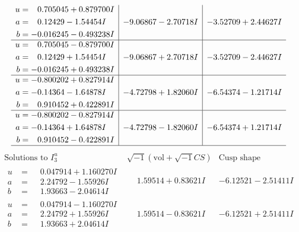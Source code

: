 \documentclass[1p]{elsarticle_modified}
\theoremstyle{definition}
\newcommand{\I}{\sqrt{-1}}
\begin{document}
$$\begin{array}{c|c|c}
\begin{aligned}
u &= \phantom{-}0.705045 + 0.879700 I \\
a &= \phantom{-}0.12429 - 1.54454 I \\
b &= -0.016245 - 0.493238 I\end{aligned}
 & -9.06867 - 2.70718 I & -3.52709 + 2.44627 I \\ \hline\begin{aligned}
u &= \phantom{-}0.705045 - 0.879700 I \\
a &= \phantom{-}0.12429 + 1.54454 I \\
b &= -0.016245 + 0.493238 I\end{aligned}
 & -9.06867 + 2.70718 I & -3.52709 - 2.44627 I \\ \hline\begin{aligned}
u &= -0.800202 + 0.827914 I \\
a &= -0.14364 - 1.64878 I \\
b &= \phantom{-}0.910452 + 0.422891 I\end{aligned}
 & -4.72798 + 1.82060 I & -6.54374 - 1.21714 I \\ \hline\begin{aligned}
u &= -0.800202 - 0.827914 I \\
a &= -0.14364 + 1.64878 I \\
b &= \phantom{-}0.910452 - 0.422891 I\end{aligned}
 & -4.72798 - 1.82060 I & -6.54374 + 1.21714 I\\
 \hline 
 \end{array}$$\newpage$$\begin{array}{c|c|c}  
\text{Solutions to }I^u_{3}& \I (\text{vol} + \sqrt{-1}CS) & \text{Cusp shape}\\
 \hline 
\begin{aligned}
u &= \phantom{-}0.047914 + 1.160270 I \\
a &= \phantom{-}2.24792 - 1.55926 I \\
b &= \phantom{-}1.93663 - 2.04614 I\end{aligned}
 & \phantom{-}1.59514 + 0.83621 I & -6.12521 - 2.51411 I \\ \hline\begin{aligned}
u &= \phantom{-}0.047914 - 1.160270 I \\
a &= \phantom{-}2.24792 + 1.55926 I \\
b &= \phantom{-}1.93663 + 2.04614 I\end{aligned}
 & \phantom{-}1.59514 - 0.83621 I & -6.12521 + 2.51411 I \\ \hline\begin{aligned}

\end{aligned}
\end{array}$$
\end{document}
